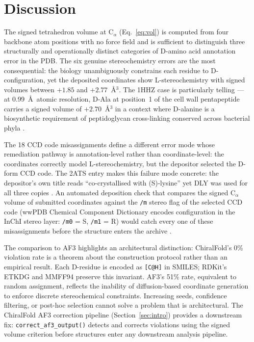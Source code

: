 \documentclass[11pt]{article}
\begin{document}
\section{Discussion}

The signed tetrahedron volume at C$_\alpha$ (Eq.~\ref{eq:vol}) is
computed from four backbone atom positions with no force field and
is sufficient to distinguish three structurally and operationally
distinct categories of D-amino acid annotation error in the PDB. The six
genuine stereochemistry errors are the most consequential: the biology
unambiguously constrains each residue to D-configuration, yet the
deposited coordinates show L-stereochemistry with signed volumes between
$+1.85$ and $+2.77$~\AA$^3$. The 1HHZ case is particularly telling ---
at 0.99~\AA\ atomic resolution, D-Ala at position~1 of the cell wall
pentapeptide carries a signed volume of $+2.70$~\AA$^3$ in a context
where D-alanine is a biosynthetic requirement of peptidoglycan
cross-linking conserved across bacterial phyla
\citep{miyamoto2021,cava2011}.

The 18 CCD code misassignments define a different error mode whose
remediation pathway is annotation-level rather than coordinate-level:
the coordinates correctly model L-stereochemistry, but the depositor
selected the D-form CCD code. The 2ATS entry makes this failure mode
concrete: the depositor's own title reads ``co-crystallised with
(S)-lysine'' yet DLY was used for all three copies \citep{shao2015}.
An automated deposition check that compares the signed C$_\alpha$ volume
of submitted coordinates against the \texttt{/m} stereo flag of the
selected CCD code (wwPDB Chemical Component Dictionary encodes
configuration in the InChI stereo layer: \texttt{/m0} = S, \texttt{/m1}
= R) would catch every one of these misassignments before the structure
enters the archive \citep{outcome2016}.

The comparison to AF3 highlights an architectural distinction: ChiralFold's
0\% violation rate is a theorem about the construction protocol rather
than an empirical result. Each D-residue is encoded as \texttt{[C@H]} in
SMILES; RDKit's ETKDG and MMFF94 preserve this invariant. AF3's 51\%
rate, equivalent to random assignment, reflects the inability of
diffusion-based coordinate generation to enforce discrete stereochemical
constraints. Increasing seeds, confidence filtering, or post-hoc
selection cannot solve a problem that is architectural. The ChiralFold
AF3 correction pipeline (Section~\ref{sec:intro}) provides a downstream
fix: \texttt{correct\_af3\_output()} detects and corrects violations
using the signed volume criterion before structures enter any downstream
analysis pipeline.
\end{document}
